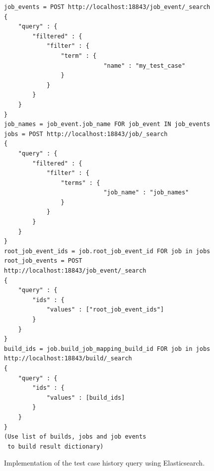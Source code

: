 \begin{figure}
\begin{mdframed}
\begin{verbatim}
job_events = POST http://localhost:18843/job_event/_search
{
    "query" : {
        "filtered" : {
            "filter" : {
                "term" : {
                            "name" : "my_test_case"
                }
            }
        }
    }
}
job_names = job_event.job_name FOR job_event IN job_events
jobs = POST http://localhost:18843/job/_search
{
    "query" : {
        "filtered" : {
            "filter" : {
                "terms" : {
                            "job_name" : "job_names"
                }
            }
        }
    }
}
root_job_event_ids = job.root_job_event_id FOR job in jobs
root_job_events = POST http://localhost:18843/job_event/_search
{ 
    "query" : {
        "ids" : { 
            "values" : ["root_job_event_ids"]
        }
    }
}
build_ids = job.build_job_mapping_build_id FOR job in jobs
http://localhost:18843/build/_search
{ 
    "query" : {
        "ids" : { 
            "values" : [build_ids]
        }
    }
}
(Use list of builds, jobs and job events 
 to build result dictionary)
\end{verbatim}
\end{mdframed}
\caption{Implementation of the test case history query using Elasticsearch.}
\label{code:tc_history_es}
\end{figure}
 
%
%



